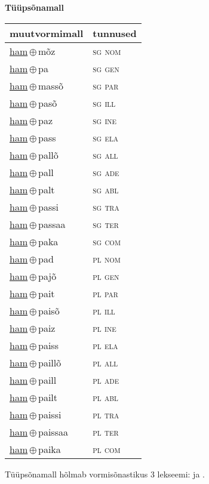 

\vspace{3.5em}
\noindent \begin{minipage}{\textwidth}
\noindent \textbf{Tüüpsõnamall \,}\\

\begin{sideways}
\begin{tabular}{l l}
muutvormimall & tunnused \\
\hline
\underline{ham}\,$\oplus$\,mõz & \textsc{ sg nom } \\
\underline{ham}\,$\oplus$\,pa & \textsc{ sg gen } \\
\underline{ham}\,$\oplus$\,massõ & \textsc{ sg par } \\
\underline{ham}\,$\oplus$\,pasõ & \textsc{ sg ill } \\
\underline{ham}\,$\oplus$\,paz & \textsc{ sg ine } \\
\underline{ham}\,$\oplus$\,pass & \textsc{ sg ela } \\
\underline{ham}\,$\oplus$\,pallõ & \textsc{ sg all } \\
\underline{ham}\,$\oplus$\,pall & \textsc{ sg ade } \\
\underline{ham}\,$\oplus$\,palt & \textsc{ sg abl } \\
\underline{ham}\,$\oplus$\,passi & \textsc{ sg tra } \\
\underline{ham}\,$\oplus$\,passaa & \textsc{ sg ter } \\
\underline{ham}\,$\oplus$\,paka & \textsc{ sg com } \\
\underline{ham}\,$\oplus$\,pad & \textsc{ pl nom } \\
\underline{ham}\,$\oplus$\,pajõ & \textsc{ pl gen } \\
\underline{ham}\,$\oplus$\,pait & \textsc{ pl par } \\
\underline{ham}\,$\oplus$\,paisõ & \textsc{ pl ill } \\
\underline{ham}\,$\oplus$\,paiz & \textsc{ pl ine } \\
\underline{ham}\,$\oplus$\,paiss & \textsc{ pl ela } \\
\underline{ham}\,$\oplus$\,paillõ & \textsc{ pl all } \\
\underline{ham}\,$\oplus$\,paill & \textsc{ pl ade } \\
\underline{ham}\,$\oplus$\,pailt & \textsc{ pl abl } \\
\underline{ham}\,$\oplus$\,paissi & \textsc{ pl tra } \\
\underline{ham}\,$\oplus$\,paissaa & \textsc{ pl ter } \\
\underline{ham}\,$\oplus$\,paika & \textsc{ pl com } \\
\end{tabular}
\end{sideways}
\label{tab:tüüpsõnamall-hammõz}

\end{minipage}

 
\vspace{1em}
\noindent Tüüpsõnamall  hõlmab vormisõnastikus 3 lekseemi:  ja .
